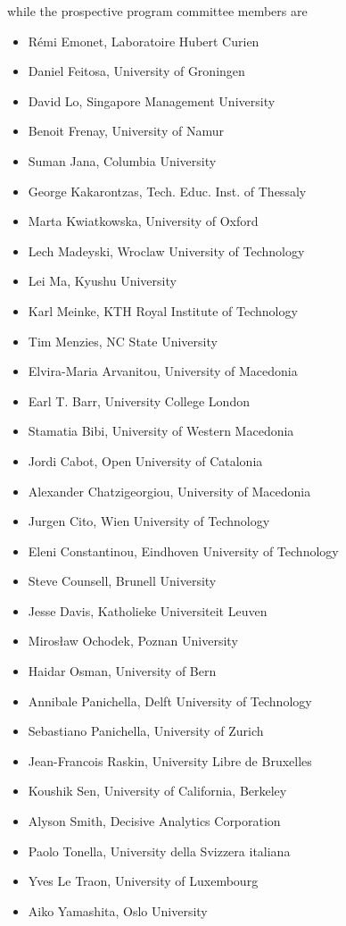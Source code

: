 	while the prospective program committee members are

\begin{itemize}[itemsep=0.5em]
	
	
	\item Rémi Emonet, Laboratoire Hubert Curien
	\item Daniel Feitosa, University of Groningen
    \item David Lo, Singapore Management University
	\item Benoit Frenay, University of Namur
	\item Suman Jana, Columbia University
    \item George Kakarontzas, Tech. Educ. Inst. of Thessaly
	\item Marta Kwiatkowska, University of Oxford
	\item Lech Madeyski, Wroclaw University of Technology
    \item Lei Ma, Kyushu University
	\item Karl Meinke, KTH Royal Institute of Technology
	\item Tim Menzies, NC State University
	\item Elvira-Maria Arvanitou, University of Macedonia
	\item Earl T. Barr, University College London
	\item Stamatia Bibi, University of Western Macedonia
	\item Jordi Cabot, Open University of Catalonia
	\item Alexander Chatzigeorgiou, University of Macedonia
	\item Jurgen Cito, Wien University of Technology
	\item Eleni Constantinou, Eindhoven University of Technology
	\item Steve Counsell, Brunell University
	\item Jesse Davis, Katholieke Universiteit Leuven
	\item Mirosław Ochodek, Poznan University
	\item Haidar Osman, University of Bern
	\item Annibale Panichella, Delft University of Technology
	\item Sebastiano Panichella, University of Zurich
	\item Jean-Francois Raskin, University Libre de Bruxelles
	\item Koushik Sen, University of California, Berkeley
	\item Alyson Smith, Decisive Analytics Corporation
	\item Paolo Tonella, University della Svizzera italiana
	\item Yves Le Traon, University of Luxembourg
	\item Aiko Yamashita, Oslo University

\end{itemize}
